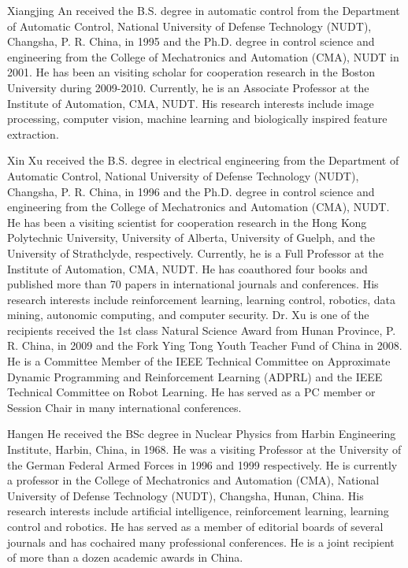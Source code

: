 \documentclass[10pt,journal,cspaper,compsoc]{IEEEtran}
\begin{document}
\begin{IEEEbiography}{Xiangjing An}
received the B.S. degree in automatic control from the Department of Automatic Control, National University of Defense Technology (NUDT), Changsha, P. R. China, in 1995 and the Ph.D. degree in control science and engineering from the College of Mechatronics and Automation (CMA), NUDT in 2001. He has been an visiting scholar for cooperation research in the Boston University during 2009-2010. Currently, he is an Associate Professor at the Institute of Automation, CMA, NUDT. His research interests include image processing, computer vision, machine learning and biologically inspired feature extraction.
\end{IEEEbiography}
\begin{IEEEbiography}{Xin Xu}
received the B.S. degree in electrical engineering from the Department of Automatic Control, National University of Defense Technology (NUDT), Changsha, P. R. China, in 1996 and the Ph.D. degree in control science and engineering from the College of Mechatronics and Automation (CMA), NUDT. He has been a visiting scientist for cooperation research in the Hong Kong Polytechnic University, University of Alberta, University of Guelph, and the University of Strathclyde, respectively. Currently, he is a Full Professor at the Institute of Automation, CMA, NUDT. He has coauthored four books and published more than 70 papers in international journals and conferences. His research interests include reinforcement learning, learning control, robotics, data mining, autonomic computing, and computer security.
Dr. Xu is one of the recipients received the 1st class Natural Science Award from Hunan Province, P. R. China, in 2009 and the Fork Ying Tong Youth Teacher Fund of China in 2008. He is a Committee Member of the IEEE Technical Committee on Approximate Dynamic Programming and Reinforcement Learning (ADPRL) and the IEEE Technical Committee on Robot Learning. He has served as a PC member or Session Chair in many international conferences.
\end{IEEEbiography}
\begin{IEEEbiography}{Hangen He}
received the BSc degree in Nuclear Physics from Harbin Engineering Institute, Harbin, China, in 1968. He was a visiting Professor at the University of the German Federal Armed Forces in 1996 and 1999 respectively. He is currently a professor in the College of Mechatronics and Automation (CMA), National University of Defense Technology (NUDT), Changsha, Hunan, China. His research interests include artificial intelligence, reinforcement learning, learning control and robotics. He has served as a member of editorial boards of several journals and has cochaired many professional conferences. He is a joint recipient of more than a dozen academic awards in China.
\end{IEEEbiography}
\end{document}
